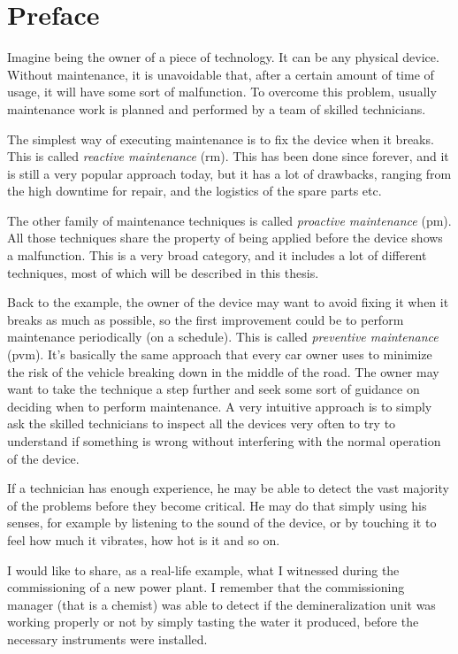 \section{Preface}
\label{sec:preface}

Imagine being the owner of a piece of technology. It can be any physical device. Without maintenance, it is unavoidable that, after a certain amount of time of usage, it will have some sort of malfunction.
To overcome this problem, usually maintenance work is planned and performed by a team of skilled technicians. 

The simplest way of executing maintenance is to fix the device when it breaks. This is called \emph{reactive maintenance} (\gls{rm}). This has been done since forever, and it is still a very popular approach today, but it has a lot of drawbacks, ranging from the high downtime for repair, and the logistics of the spare parts etc.

The other family of maintenance techniques is called \emph{proactive maintenance} (\gls{pm}). All those techniques share the property of being applied before the device shows a malfunction. This is a very broad category, and it includes a lot of different techniques, most of which will be described in this thesis.

Back to the example, the owner of the device may want to avoid fixing it when it breaks as much as possible, so the first improvement could be to perform maintenance periodically (on a schedule). This is called \emph{preventive maintenance} (\gls{pvm}). It's basically the same approach that every car owner uses to minimize the risk of the vehicle breaking down in the middle of the road. 
The owner may want to take the technique a step further and seek some sort of guidance on deciding when to perform maintenance. A very intuitive approach is to simply ask the skilled technicians to inspect all the devices very often to try to understand if something is wrong without interfering with the normal operation of the device.

If a technician has enough experience, he may be able to detect the vast majority of the problems before they become critical. He may do that simply using his senses, for example by listening to the sound of the device, or by touching it to feel how much it vibrates, how hot is it and so on. 

I would like to share, as a real-life example, what I witnessed during the commissioning of a new power plant. I remember that the commissioning manager (that is a chemist) was able to detect if the demineralization unit was working properly or not by simply tasting the water it produced, before the necessary instruments were installed.

